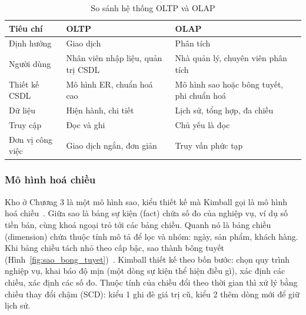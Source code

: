 \begin{table}[!htbp]
\centering
\caption{So sánh hệ thống OLTP và OLAP}
\label{tab:oltp_olap}
\begin{tabular}{p{3.2cm}p{5cm}p{5.5cm}}
\toprule
\textbf{Tiêu chí} & \textbf{OLTP} & \textbf{OLAP} \\
\midrule
Định hướng & Giao dịch & Phân tích \\
Người dùng & Nhân viên nhập liệu, quản trị CSDL & Nhà quản lý, chuyên viên phân tích \\
Thiết kế CSDL & Mô hình ER, chuẩn hoá cao & Mô hình sao hoặc bông tuyết, phi chuẩn hoá \\
Dữ liệu & Hiện hành, chi tiết & Lịch sử, tổng hợp, đa chiều \\
Truy cập & Đọc và ghi & Chủ yếu là đọc \\
Đơn vị công việc & Giao dịch ngắn, đơn giản & Truy vấn phức tạp \\
\bottomrule
\end{tabular}
\end{table}

\subsubsection{Mô hình hoá chiều}
Kho ở Chương 3 là một mô hình sao, kiểu thiết kế mà Kimball gọi là mô hình hoá chiều~\cite{kimball2013}. Giữa sao là bảng sự kiện (fact) chứa số đo của nghiệp vụ, ví dụ số tiền bán, cùng khoá ngoại trỏ tới các bảng chiều. Quanh nó là bảng chiều (dimension) chứa thuộc tính mô tả để lọc và nhóm: ngày, sản phẩm, khách hàng. Khi bảng chiều tách nhỏ theo cấp bậc, sao thành bông tuyết (Hình~\ref{fig:sao_bong_tuyet})~\cite{han2011}. Kimball thiết kế theo bốn bước: chọn quy trình nghiệp vụ, khai báo độ mịn (một dòng sự kiện thể hiện điều gì), xác định các chiều, xác định các số đo. Thuộc tính của chiều đổi theo thời gian thì xử lý bằng chiều thay đổi chậm (SCD): kiểu 1 ghi đè giá trị cũ, kiểu 2 thêm dòng mới để giữ lịch sử.

